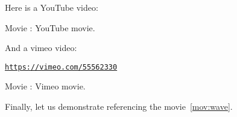 \documentclass[%
oneside,                 %
final,                   %
10pt]{article}
\newenvironment{doconce:movie}{}{}
\newcounter{doconce:movie:counter}
\begin{document}
Here is a YouTube video:
\begin{doconce:movie}
\begin{center}
\end{center}
\begin{center}  %
Movie : YouTube movie.
\end{center}
\end{doconce:movie}
And a vimeo video:
\begin{doconce:movie}
\begin{center}\href{{https://vimeo.com/55562330}}{\nolinkurl{https://vimeo.com/55562330}}\end{center}
\begin{center}  %
Movie : Vimeo movie.
\end{center}
\end{doconce:movie}
Finally, let us demonstrate referencing the movie~\ref{mov:wave}.
\end{document}
